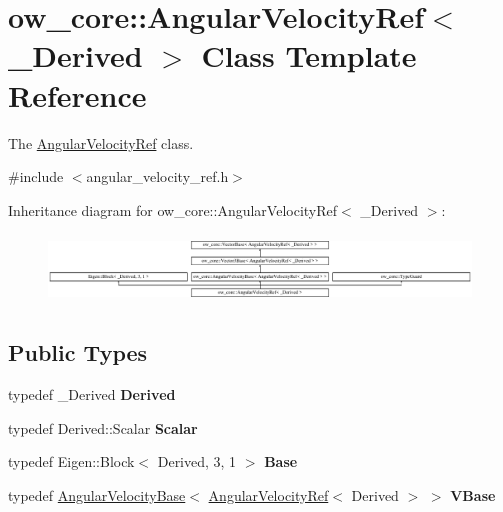 \hypertarget{classow__core_1_1AngularVelocityRef}{}\section{ow\+\_\+core\+:\+:Angular\+Velocity\+Ref$<$ \+\_\+\+Derived $>$ Class Template Reference}
\label{classow__core_1_1AngularVelocityRef}


The \hyperlink{classow__core_1_1AngularVelocityRef}{Angular\+Velocity\+Ref} class.  




{\ttfamily \#include $<$angular\+\_\+velocity\+\_\+ref.\+h$>$}

Inheritance diagram for ow\+\_\+core\+:\+:Angular\+Velocity\+Ref$<$ \+\_\+\+Derived $>$\+:\begin{figure}[H]
\begin{center}
\leavevmode
\includegraphics[height=1.848185cm]{de/d7d/classow__core_1_1AngularVelocityRef}
\end{center}
\end{figure}
\subsection*{Public Types}
\begin{DoxyCompactItemize}
\item 
typedef \+\_\+\+Derived {\bfseries Derived}\hypertarget{classow__core_1_1AngularVelocityRef_a05048cc839f03a8b0a013fd5b92aec21}{}\label{classow__core_1_1AngularVelocityRef_a05048cc839f03a8b0a013fd5b92aec21}

\item 
typedef Derived\+::\+Scalar {\bfseries Scalar}\hypertarget{classow__core_1_1AngularVelocityRef_a4cf8c55b2e15efad9d58e8730feb353b}{}\label{classow__core_1_1AngularVelocityRef_a4cf8c55b2e15efad9d58e8730feb353b}

\item 
typedef Eigen\+::\+Block$<$ Derived, 3, 1 $>$ {\bfseries Base}\hypertarget{classow__core_1_1AngularVelocityRef_a0634ca2ec5b81d95848be0f882c653ad}{}\label{classow__core_1_1AngularVelocityRef_a0634ca2ec5b81d95848be0f882c653ad}

\item 
typedef \hyperlink{classow__core_1_1AngularVelocityBase}{Angular\+Velocity\+Base}$<$ \hyperlink{classow__core_1_1AngularVelocityRef}{Angular\+Velocity\+Ref}$<$ Derived $>$ $>$ {\bfseries V\+Base}\hypertarget{classow__core_1_1AngularVelocityRef_a8ef194736c9657536b41284f164672c2}{}\label{classow__core_1_1AngularVelocityRef_a8ef194736c9657536b41284f164672c2}

\end{DoxyCompactItemize}
